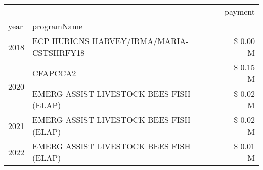 \begin{tabular}{llr}
\toprule
 &  & payment \\
year & programName &  \\
\midrule
2018 & ECP HURICNS HARVEY/IRMA/MARIA-CSTSHRFY18 & \$ 0.00 M \\
\cline{1-3}
\multirow[t]{2}{*}{2020} & CFAPCCA2 & \$ 0.15 M \\
 & EMERG ASSIST LIVESTOCK BEES FISH (ELAP) & \$ 0.02 M \\
\cline{1-3}
2021 & EMERG ASSIST LIVESTOCK BEES FISH (ELAP) & \$ 0.02 M \\
\cline{1-3}
2022 & EMERG ASSIST LIVESTOCK BEES FISH (ELAP) & \$ 0.01 M \\
\cline{1-3}
\bottomrule
\end{tabular}
